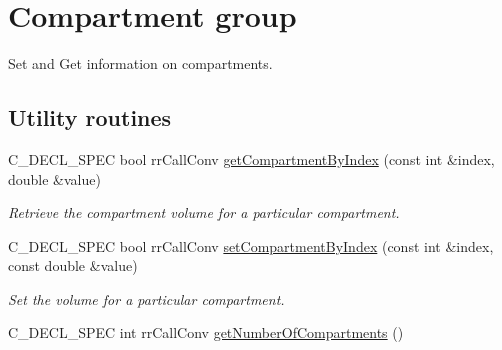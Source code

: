 \hypertarget{group__compartment}{
\section{\-Compartment group}
\label{group__compartment}
}


\-Set and \-Get information on compartments.  


\subsection*{\-Utility routines}
\begin{DoxyCompactItemize}
\item 
\-C\-\_\-\-D\-E\-C\-L\-\_\-\-S\-P\-E\-C bool rr\-Call\-Conv \hyperlink{group__utility_ga5241b915cff8bcabba3024c33fb4e336}{get\-Compartment\-By\-Index} (const int \&index, double \&value)
\begin{DoxyCompactList}\small\item\em \-Retrieve the compartment volume for a particular compartment. \end{DoxyCompactList}\item 
\-C\-\_\-\-D\-E\-C\-L\-\_\-\-S\-P\-E\-C bool rr\-Call\-Conv \hyperlink{group__utility_gadb238a943d93bc9548bf5c3cd452e9bb}{set\-Compartment\-By\-Index} (const int \&index, const double \&value)
\begin{DoxyCompactList}\small\item\em \-Set the volume for a particular compartment. \end{DoxyCompactList}\item 
\hypertarget{group__utility_ga5ea2479b882549edd4fb75397ca38f52}{
\-C\-\_\-\-D\-E\-C\-L\-\_\-\-S\-P\-E\-C int rr\-Call\-Conv \hyperlink{group__utility_ga5ea2479b882549edd4fb75397ca38f52}{get\-Number\-Of\-Compartments} ()}
\label{group__utility_ga5ea2479b882549edd4fb75397ca38f52}


\end{DoxyCompactItemize}

